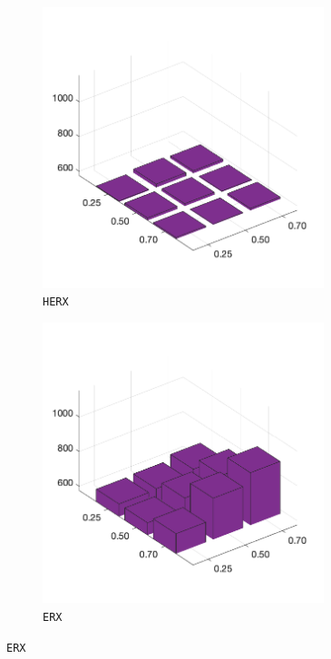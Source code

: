 \begin{figure}[H]
\begin{subfigure}[b]{0.25\textwidth}
		\includegraphics[width=0.9\textwidth]{crossover/min/cross_edge_heuristic_4.png}
		\caption{\texttt{HERX}}
		\label{fig:y}
    	\end{subfigure}
%
	\begin{subfigure}[b]{0.25\textwidth}
		\centering
		\includegraphics[width=0.9\textwidth]{crossover/min/cross_edge_recombination_4.png}
		\caption{\texttt{ERX}}
		\label{fig:z}

\end{subfigure}
\end{figure}
